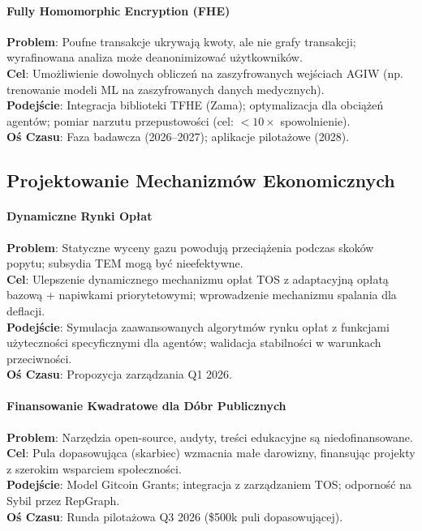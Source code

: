 \documentclass[11pt]{article}
\begin{document}
\paragraph{Fully Homomorphic Encryption (FHE)}
\textbf{Problem}: Poufne transakcje ukrywają kwoty, ale nie grafy transakcji; wyrafinowana analiza może deanonimizować użytkowników.\\
\textbf{Cel}: Umożliwienie dowolnych obliczeń na zaszyfrowanych wejściach AGIW (np. trenowanie modeli ML na zaszyfrowanych danych medycznych).\\
\textbf{Podejście}: Integracja biblioteki TFHE (Zama); optymalizacja dla obciążeń agentów; pomiar narzutu przepustowości (cel: $<10\times$ spowolnienie).\\
\textbf{Oś Czasu}: Faza badawcza (2026--2027); aplikacje pilotażowe (2028).

\subsection{Projektowanie Mechanizmów Ekonomicznych}

\paragraph{Dynamiczne Rynki Opłat}
\textbf{Problem}: Statyczne wyceny gazu powodują przeciążenia podczas skoków popytu; subsydia TEM mogą być nieefektywne.\\
\textbf{Cel}: Ulepszenie dynamicznego mechanizmu opłat TOS z adaptacyjną opłatą bazową + napiwkami priorytetowymi; wprowadzenie mechanizmu spalania dla deflacji.\\
\textbf{Podejście}: Symulacja zaawansowanych algorytmów rynku opłat z funkcjami użyteczności specyficznymi dla agentów; walidacja stabilności w warunkach przeciwności.\\
\textbf{Oś Czasu}: Propozycja zarządzania Q1 2026.

\paragraph{Finansowanie Kwadratowe dla Dóbr Publicznych}
\textbf{Problem}: Narzędzia open-source, audyty, treści edukacyjne są niedofinansowane.\\
\textbf{Cel}: Pula dopasowująca (skarbiec) wzmacnia małe darowizny, finansując projekty z szerokim wsparciem społeczności.\\
\textbf{Podejście}: Model Gitcoin Grants; integracja z zarządzaniem TOS; odporność na Sybil przez RepGraph.\\
\textbf{Oś Czasu}: Runda pilotażowa Q3 2026 (\$500k puli dopasowującej).
\end{document}
